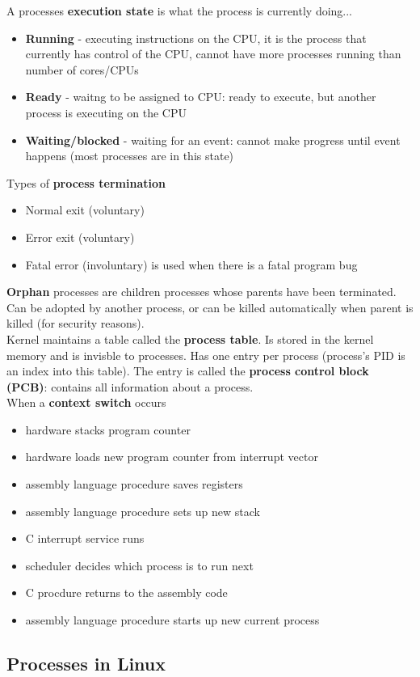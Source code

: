 \documentclass{article}
\renewcommand{\b}{\item[$\circ$]}
\newcommand{\newlist}{\begin{itemize}}
\renewcommand{\endlist}{\end{itemize}}
\begin{document}
    \noindent A processes \textbf{execution state} is what the process is currently doing...

    \begin{itemize}
    \item \textbf{Running} - executing instructions on the CPU, it is the process that currently has control of the CPU, cannot have more processes running than number of cores/CPUs
    \item \textbf{Ready} - waitng to be assigned to CPU: ready to execute, but another process is executing on the CPU
    \item \textbf{Waiting/blocked} - waiting for an event: cannot make progress until event happens (most processes are in this state)
    \end{itemize}

    \noindent Types of \textbf{process termination}
    \begin{itemize}
    \item Normal exit (voluntary)
    \item Error exit (voluntary)
    \item Fatal error (involuntary) is used when there is a fatal program bug
    \end{itemize}

    \noindent \textbf{Orphan} processes are children processes whose parents have been terminated. Can be adopted by another process, or can be killed automatically when parent is killed (for security reasons). \\

    \noindent Kernel maintains a table called the \textbf{process table}. Is stored in the kernel memory and is invisble to processes. Has one entry per process (process's PID is an index into this table). The entry is called the \textbf{process control block (PCB)}: contains all information about a process. \\

    \noindent When a \textbf{context switch} occurs
    
    \newlist
    \b hardware stacks program counter
    \b hardware loads new program counter from interrupt vector
    \b assembly language procedure saves registers 
    \b assembly language procedure sets up new stack
    \b C interrupt service runs
    \b scheduler decides which process is to run next
    \b C procdure returns to the assembly code
    \b assembly language procedure starts up new current process
    \endlist

\subsection{Processes in Linux}
\end{document}
